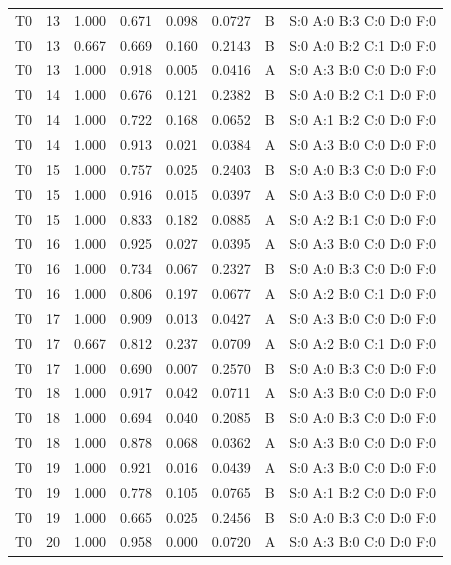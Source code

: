 \begin{longtable}{lrrrrrll}
T0 & 13 & 1.000 & 0.671 & 0.098 & 0.0727 & B & \tiny S:0 A:0 B:3 C:0 D:0 F:0 \\
T0 & 13 & 0.667 & 0.669 & 0.160 & 0.2143 & B & \tiny S:0 A:0 B:2 C:1 D:0 F:0 \\
T0 & 13 & 1.000 & 0.918 & 0.005 & 0.0416 & A & \tiny S:0 A:3 B:0 C:0 D:0 F:0 \\
T0 & 14 & 1.000 & 0.676 & 0.121 & 0.2382 & B & \tiny S:0 A:0 B:2 C:1 D:0 F:0 \\
T0 & 14 & 1.000 & 0.722 & 0.168 & 0.0652 & B & \tiny S:0 A:1 B:2 C:0 D:0 F:0 \\
T0 & 14 & 1.000 & 0.913 & 0.021 & 0.0384 & A & \tiny S:0 A:3 B:0 C:0 D:0 F:0 \\
T0 & 15 & 1.000 & 0.757 & 0.025 & 0.2403 & B & \tiny S:0 A:0 B:3 C:0 D:0 F:0 \\
T0 & 15 & 1.000 & 0.916 & 0.015 & 0.0397 & A & \tiny S:0 A:3 B:0 C:0 D:0 F:0 \\
T0 & 15 & 1.000 & 0.833 & 0.182 & 0.0885 & A & \tiny S:0 A:2 B:1 C:0 D:0 F:0 \\
T0 & 16 & 1.000 & 0.925 & 0.027 & 0.0395 & A & \tiny S:0 A:3 B:0 C:0 D:0 F:0 \\
T0 & 16 & 1.000 & 0.734 & 0.067 & 0.2327 & B & \tiny S:0 A:0 B:3 C:0 D:0 F:0 \\
T0 & 16 & 1.000 & 0.806 & 0.197 & 0.0677 & A & \tiny S:0 A:2 B:0 C:1 D:0 F:0 \\
T0 & 17 & 1.000 & 0.909 & 0.013 & 0.0427 & A & \tiny S:0 A:3 B:0 C:0 D:0 F:0 \\
T0 & 17 & 0.667 & 0.812 & 0.237 & 0.0709 & A & \tiny S:0 A:2 B:0 C:1 D:0 F:0 \\
T0 & 17 & 1.000 & 0.690 & 0.007 & 0.2570 & B & \tiny S:0 A:0 B:3 C:0 D:0 F:0 \\
T0 & 18 & 1.000 & 0.917 & 0.042 & 0.0711 & A & \tiny S:0 A:3 B:0 C:0 D:0 F:0 \\
T0 & 18 & 1.000 & 0.694 & 0.040 & 0.2085 & B & \tiny S:0 A:0 B:3 C:0 D:0 F:0 \\
T0 & 18 & 1.000 & 0.878 & 0.068 & 0.0362 & A & \tiny S:0 A:3 B:0 C:0 D:0 F:0 \\
T0 & 19 & 1.000 & 0.921 & 0.016 & 0.0439 & A & \tiny S:0 A:3 B:0 C:0 D:0 F:0 \\
T0 & 19 & 1.000 & 0.778 & 0.105 & 0.0765 & B & \tiny S:0 A:1 B:2 C:0 D:0 F:0 \\
T0 & 19 & 1.000 & 0.665 & 0.025 & 0.2456 & B & \tiny S:0 A:0 B:3 C:0 D:0 F:0 \\
T0 & 20 & 1.000 & 0.958 & 0.000 & 0.0720 & A & \tiny S:0 A:3 B:0 C:0 D:0 F:0 \\

\end{longtable}
